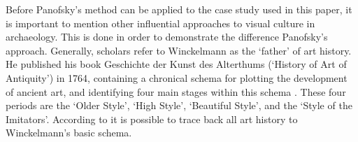 Before Panofsky’s method can be applied to the case study used in this paper, it is important to mention other influential approaches to visual culture in archaeology. This is done in order to demonstrate the difference Panofsky’s approach. Generally, scholars refer to Winckelmann as the ‘father’ of art history. He published his book Geschichte der Kunst des Alterthums (‘History of Art of Antiquity’) in 1764, containing a chronical schema for plotting the development of ancient art, and identifying four main stages within this schema \parencite[68--69] {BeardHenderson_2001}. These four periods are the ‘Older Style’, ‘High Style’, ‘Beautiful Style’, and the ‘Style of the Imitators’. According to \textcite {BeardHenderson_2001}  it is possible to trace back all art history to Winckelmann’s basic schema.

